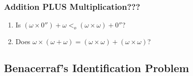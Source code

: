 \begin{frame}
\frametitle{Addition PLUS Multiplication???}

\begin{enumerate}[<+->]

\item Is \((\omega \times 0'') + \omega <_o (\omega \times \omega) + 0''\)?

\item Does \(\omega \times (\omega + \omega) = (\omega \times \omega) + (\omega \times \omega)\)?





\end{enumerate}
\end{frame}




\subsection{Benacerraf's Identification Problem}

